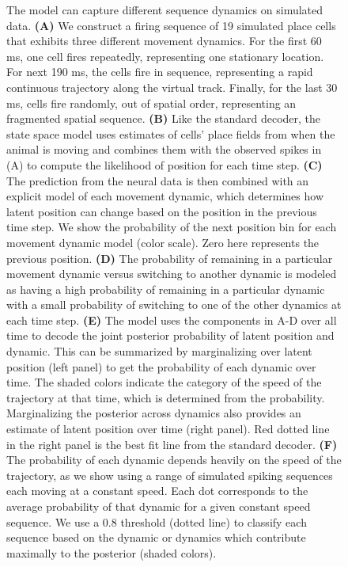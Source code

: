 \documentclass[9pt,lineno]{elife}
\begin{document}
\begin{figure}
\caption{The model can capture different sequence dynamics on simulated data. \textbf{(A)} We construct a firing sequence of 19 simulated place cells that exhibits three different movement dynamics. For the first 60 ms, one cell fires repeatedly, representing one stationary location. For next 190 ms, the cells fire in sequence, representing a rapid continuous trajectory along the virtual track. Finally, for the last 30 ms, cells fire randomly, out of spatial order, representing an fragmented spatial sequence. \textbf{(B)} Like the standard decoder, the state space model uses estimates of cells' place fields from when the animal is moving and combines them with the observed spikes in (A) to compute the likelihood of position for each time step. \textbf{(C)} The prediction from the neural data is then combined with an explicit model of each movement dynamic, which determines how latent position can change based on the position in the previous time step. We show the probability of the next position bin for each movement dynamic model (color scale). Zero here represents the previous position. \textbf{(D)} The probability of remaining in a particular movement dynamic versus switching to another dynamic is modeled as having a high probability of remaining in a particular dynamic with a small probability of switching to one of the other dynamics at each time step. \textbf{(E)} The model uses the components in A-D over all time to decode the joint posterior probability of latent position and dynamic. This can be summarized by marginalizing over latent position (left panel) to get the probability of each dynamic over time. The shaded colors indicate the category of the speed of the trajectory at that time, which is determined from the probability. Marginalizing the posterior across dynamics also provides an estimate of latent position over time (right panel). Red dotted line in the right panel is the best fit line from the standard decoder. \textbf{(F)} The probability of each dynamic depends heavily on the speed of the trajectory, as we show using a range of simulated spiking sequences each moving at a constant speed. Each dot corresponds to the average probability of that dynamic for a given constant speed sequence. We use a 0.8 threshold (dotted line) to classify each sequence based on the dynamic or dynamics which contribute maximally to the posterior (shaded colors).
}
\label{fig:1}

\end{figure}
\end{document}
